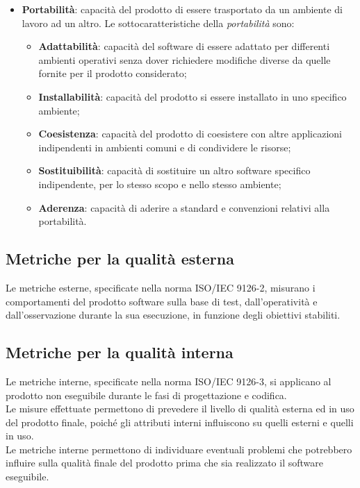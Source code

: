 \begin{itemize}
\begin{itemize}
	\end{itemize}
\item \textbf{Portabilità}: capacità del prodotto di essere trasportato da un ambiente di lavoro ad un altro. Le sottocaratteristiche della \textit{portabilità} sono:
	\begin{itemize}
	\item \textbf{Adattabilità}: capacità del software di essere adattato per differenti ambienti operativi senza dover richiedere modifiche diverse da quelle fornite per il prodotto considerato;
	\item \textbf{Installabilità}: capacità del prodotto si essere installato in uno specifico ambiente;
	\item \textbf{Coesistenza}: capacità del prodotto di coesistere con altre applicazioni indipendenti in ambienti comuni e di condividere le risorse;
	\item \textbf{Sostituibilità}: capacità di sostituire un altro software specifico indipendente, per lo stesso scopo e nello stesso ambiente;
	\item \textbf{Aderenza}: capacità di aderire a standard e convenzioni relativi alla portabilità.
	\end{itemize}
\end{itemize}

\subsection{Metriche per la qualità esterna}
Le metriche esterne, specificate nella norma ISO/IEC 9126-2, misurano i comportamenti del prodotto software sulla base di test, dall'operatività e dall'osservazione durante la sua esecuzione, in funzione degli obiettivi stabiliti.

\subsection{Metriche per la qualità interna}
Le metriche interne, specificate nella norma ISO/IEC 9126-3, si applicano al prodotto non eseguibile durante le fasi di progettazione e codifica. \\
Le misure effettuate permettono di prevedere il livello di qualità esterna ed in uso del prodotto finale, poiché gli attributi interni influiscono su quelli esterni e quelli in uso. \\
Le metriche interne permettono di individuare eventuali problemi che potrebbero influire sulla qualità finale del prodotto prima che sia realizzato il software eseguibile.

